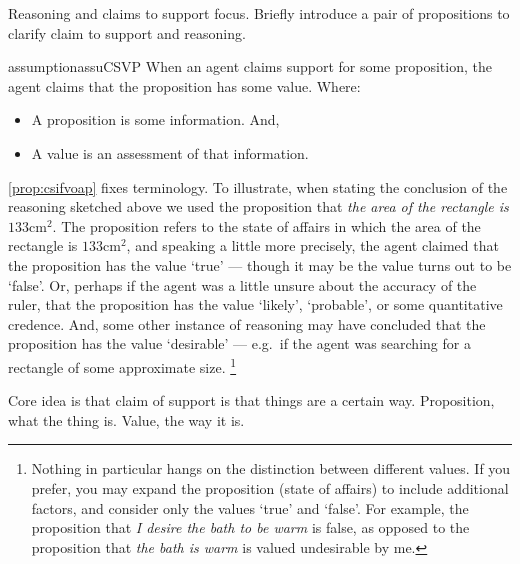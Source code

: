 \begin{note}
  Reasoning and claims to support focus.
  Briefly introduce a pair of propositions to clarify claim to support and reasoning.

  \begin{restatable}{assumption}{assuCSVP}\label{prop:csifvoap}
    When an agent claims support for some proposition, the agent claims that the proposition has some value.
    Where:
    \begin{itemize}
    \item A proposition is some information. And,
    \item A value is an assessment of that information.
    \end{itemize}
    \vspace{-\baselineskip}
  \end{restatable}
  \autoref{prop:csifvoap} fixes terminology.
  To illustrate, when stating the conclusion of the reasoning sketched above we used the proposition that \emph{the area of the rectangle is \(133\text{cm}^{2}\)}.
  The proposition refers to the state of affairs in which the area of the rectangle is \(133\text{cm}^{2}\), and speaking a little more precisely, the agent claimed that the proposition has the value `true' --- though it may be the value turns out to be `false'.
  Or, perhaps if the agent was a little unsure about the accuracy of the ruler, that the proposition has the value `likely', `probable', or some quantitative credence.
  And, some other instance of reasoning may have concluded that the proposition has the value `desirable' --- e.g.\ if the agent was searching for a rectangle of some approximate size.\nolinebreak
  \footnote{
    Nothing in particular hangs on the distinction between different values.
    If you prefer, you may expand the proposition (state of affairs) to include additional factors, and consider only the values `true' and `false'.
    For example, the proposition that \emph{I desire the bath to be warm} is false, as opposed to the proposition that \emph{the bath is warm} is valued undesirable by me.
  }

  Core idea is that claim of support is that things are a certain way.
  Proposition, what the thing is.
  Value, the way it is.
\end{note}

